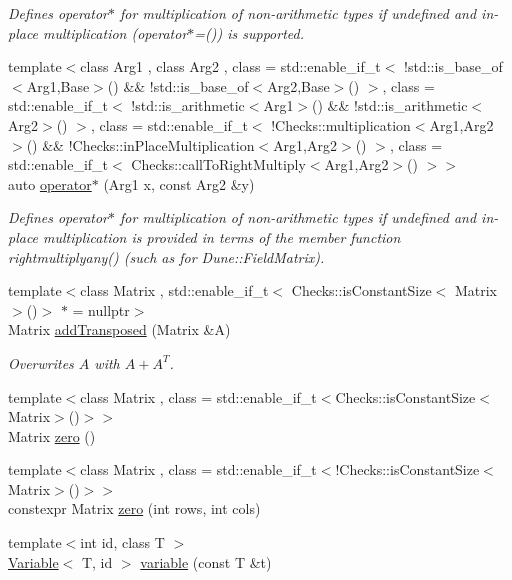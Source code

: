 \begin{DoxyCompactItemize}
\begin{DoxyCompactList}\small\item\em Defines operator$\ast$ for multiplication of non-\/arithmetic types if undefined and in-\/place multiplication (operator$\ast$=()) is supported. \end{DoxyCompactList}\item 
\hypertarget{namespaceFunG_a6e4d3266e119cd102800bf5c091e57fd}{{\footnotesize template$<$class Arg1 , class Arg2 , class  = std\-::enable\-\_\-if\-\_\-t$<$ !std\-::is\-\_\-base\-\_\-of$<$\-Arg1,\-Base$>$() \&\& !std\-::is\-\_\-base\-\_\-of$<$\-Arg2,\-Base$>$() $>$, class  = std\-::enable\-\_\-if\-\_\-t$<$ !std\-::is\-\_\-arithmetic$<$\-Arg1$>$() \&\& !std\-::is\-\_\-arithmetic$<$\-Arg2$>$() $>$, class  = std\-::enable\-\_\-if\-\_\-t$<$ !\-Checks\-::multiplication$<$\-Arg1,\-Arg2$>$() \&\&                                       !\-Checks\-::in\-Place\-Multiplication$<$\-Arg1,\-Arg2$>$() $>$, class  = std\-::enable\-\_\-if\-\_\-t$<$ Checks\-::call\-To\-Right\-Multiply$<$\-Arg1,\-Arg2$>$() $>$$>$ }\\auto \hyperlink{namespaceFunG_a6e4d3266e119cd102800bf5c091e57fd}{operator$\ast$} (Arg1 x, const Arg2 \&y)}\label{namespaceFunG_a6e4d3266e119cd102800bf5c091e57fd}

\begin{DoxyCompactList}\small\item\em Defines operator$\ast$ for multiplication of non-\/arithmetic types if undefined and in-\/place multiplication is provided in terms of the member function rightmultiplyany() (such as for Dune\-::\-Field\-Matrix). \end{DoxyCompactList}\item 
{\footnotesize template$<$class Matrix , std\-::enable\-\_\-if\-\_\-t$<$ Checks\-::is\-Constant\-Size$<$ Matrix $>$()$>$ $\ast$  = nullptr$>$ }\\Matrix \hyperlink{namespaceFunG_a0211d0d26c669d56b5113fd2292902e5}{add\-Transposed} (Matrix \&A)
\begin{DoxyCompactList}\small\item\em Overwrites $A$ with $A+A^T$. \end{DoxyCompactList}\item 
{\footnotesize template$<$class Matrix , class  = std\-::enable\-\_\-if\-\_\-t$<$\-Checks\-::is\-Constant\-Size$<$\-Matrix$>$()$>$$>$ }\\Matrix \hyperlink{namespaceFunG_a649b4470d6def401959bfea3a368c48c}{zero} ()
\item 
{\footnotesize template$<$class Matrix , class  = std\-::enable\-\_\-if\-\_\-t$<$!\-Checks\-::is\-Constant\-Size$<$\-Matrix$>$()$>$$>$ }\\constexpr Matrix \hyperlink{namespaceFunG_ae633433339ba30207aa526e54e3924b4}{zero} (int rows, int cols)
\item 
\hypertarget{namespaceFunG_a1c474456411f028e14eab67ff6eebe0c}{{\footnotesize template$<$int id, class T $>$ }\\\hyperlink{structFunG_1_1Variable}{Variable}$<$ T, id $>$ \hyperlink{namespaceFunG_a1c474456411f028e14eab67ff6eebe0c}{variable} (const T \&t)}\label{namespaceFunG_a1c474456411f028e14eab67ff6eebe0c}


\end{DoxyCompactItemize}
